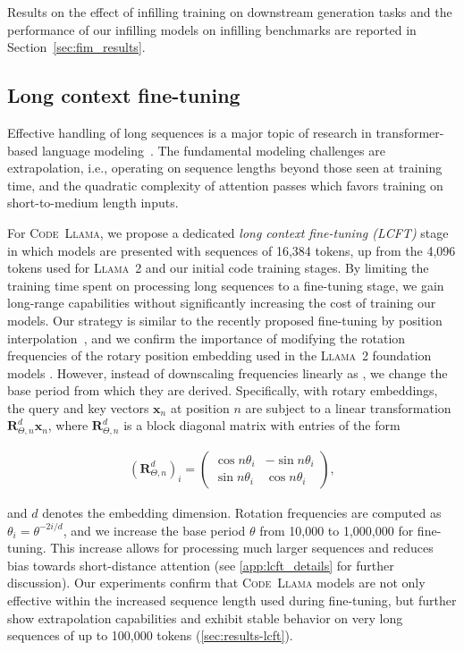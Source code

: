 Results on the effect of infilling training on downstream generation tasks and the performance of our infilling models on infilling benchmarks are reported in Section~\ref{sec:fim_results}.

\subsection{Long context fine-tuning}
\label{sec:long_context}

Effective handling of long sequences is a major topic of research in transformer-based language modeling~\citep{vaswani2017attention}. The fundamental modeling challenges are extrapolation, i.e., operating on sequence lengths beyond those seen at training time, and the quadratic complexity of attention passes which favors training on short-to-medium length inputs.

For \textsc{Code~Llama}, we propose a dedicated \emph{long context fine-tuning (LCFT)} stage in which models are presented with sequences of 16,384 tokens, up from the 4,096 tokens used for \textsc{Llama~2} and our initial code training stages. By limiting the training time spent on processing long sequences to a fine-tuning stage, we gain long-range capabilities without significantly increasing the cost of training our models. Our strategy is similar to the recently proposed fine-tuning by position interpolation~\citep{chen2023extending},  and we confirm the importance of modifying the rotation frequencies of the rotary position embedding used in the \textsc{Llama~2} foundation models \citep{su2021roformer}. However, instead of downscaling frequencies linearly as \citet{chen2023extending}, we change the base period from which they are derived. Specifically, with rotary embeddings, the query and key vectors $\mathbf{x}_n$ at position $n$ are subject to a linear transformation $\mathbf{R}^d_{\Theta,n} \mathbf{x}_n$, where $\mathbf{R}^d_{\Theta,n}$ is a block diagonal matrix with entries of the form

\begin{align*}
   \left( \mathbf{R}^d_{\Theta,n} \right) _i  =
   \begin{pmatrix}
   \cos n \theta_i & -\sin n \theta_i \\
   \sin n \theta_i & \cos n \theta_i
   \end{pmatrix},
\end{align*}

and $d$ denotes the embedding dimension. Rotation frequencies are computed as $\theta_i = \theta^{-2i/d}$, and we increase the base period $\theta$ from 10,000 to 1,000,000 for fine-tuning. This increase allows for processing much larger sequences and reduces bias towards short-distance attention (see \ref{app:lcft_details} for further discussion). Our experiments confirm that \textsc{Code~Llama} models are not only effective within the increased sequence length used during fine-tuning, but further show extrapolation capabilities and exhibit stable behavior on very long sequences of up to 100,000 tokens (\ref{sec:results-lcft}).

